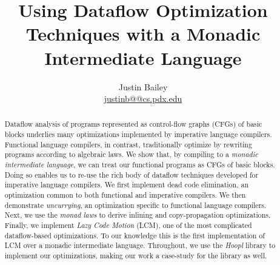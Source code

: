 \documentclass[12pt]{article}
\begin{document}


\newcommand{\authorEmail}{\url{justinb@@cs.pdx.edu}}

\date{}
\author{Justin Bailey \\ \authorEmail}
\title{Using Dataflow Optimization Techniques with a Monadic Intermediate Language}

\maketitle 
\ifthenelse{\standaloneFlag}
           {\thispagestyle{empty}}
           {}

\renewcommand{\abstractnamefont}{\normalfont\small\sffamily\bfseries}
\begin{abstract}
  Dataflow analysis of programs represented as control-flow graphs
  (CFGs) of basic blocks underlies many optimizations implemented by
  imperative language compilers. Functional language compilers, in
  contrast, traditionally optimize by rewriting programs according to
  algebraic laws. We show that, by compiling to a \emph{monadic
    intermediate language}, we can treat our functional programs as
  CFGs of basic blocks. Doing so enables us to re-use the rich body of
  dataflow techniques developed for imperative language compilers. We
  first implement dead code elimination, an optimization common to
  both functional and imperative compilers. We then demonstrate
  \emph{uncurrying}, an optimization specific to functional language
  compilers. Next, we use the \emph{monad laws} to derive inlining and
  copy-propagation optimizations. Finally, we implement \emph{Lazy
    Code Motion} (LCM), one of the most complicated dataflow-based
  optimizations. To our knowledge this is the first implementation of
  LCM over a monadic intermediate language. Throughout, we use the
  \emph{Hoopl} library to implement our optimizations, making our work
  a case-study for the library as well.
\end{abstract}
\end{document}
